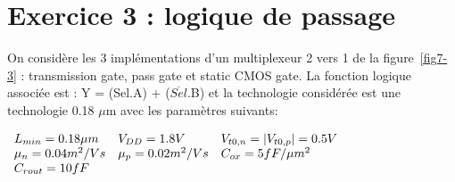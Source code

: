 \documentclass[frenchb,DIV=14]{scrartcl}
\begin{document}
\newpage
\section*{Exercice 3 : logique de passage}
On considère les 3 implémentations d'un multiplexeur 2 vers 1 de la figure~\ref{fig7-3} :
transmission gate, pass gate et static CMOS gate. La fonction logique associée est :
Y = (Sel.A) + ($\overline{Sel}$.B) et la technologie considérée est une technologie
0.18 $\mu$m avec les paramètres suivants:

\begin{center}
$
	\begin{array}{l l l}
		L_{min} = 0.18 \mu m 	& V_{DD} = 1.8 V 		& V_{t0,n} = |V_{t0,p} | = 0.5 V \\
		\mu_n = 0.04 m^2/Vs 	& \mu_p = 0.02 m^2/Vs	& C_{ox} = 5 fF/\mu m^2 \\
		C_{rout} = 10fF			&						& \\
	\end{array}
$
\end{center}
\end{document}
